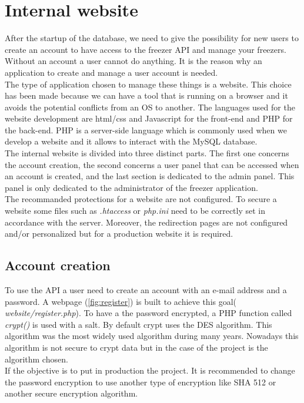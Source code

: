 \section{Internal website}
After the startup of the database, we need to give the possibility for new users to create an account to have access to the freezer API and manage your freezers. Without an account a user cannot do anything. It is the reason why an application to create and manage a user account is needed.\\

The type of application chosen to manage these things is a website. This choice has been made because we can have a tool that is running on a browser and it avoids the potential conflicts from an OS to another. The languages used for the website development are html/css and Javascript for the front-end and PHP for the back-end. PHP is a server-side language which is commonly used when we develop a website and it allows to interact with the MySQL database. \\

The internal website is divided into three distinct parts. The first one concerns the account creation, the second concerns a user panel that can be accessed when an account is created, and the last section is dedicated to the admin panel. This panel is only dedicated to the administrator of the freezer application. \\

The recommanded protections for a website are not configured. To secure a website some files such as \textit{.htaccess} or \textit{php.ini} need to be correctly set in accordance with the server. Moreover, the redirection pages are not configured and/or personalized but for a production website it is required.

\subsection{Account creation}
To use the API a user need to create an account with an e-mail address and a password. A webpage (\autoref{fig:register}) is built to achieve this goal( \textit{website/register.php}). To have a the password encrypted, a PHP function called \textit{crypt()} is used with a salt. By default crypt uses the DES algorithm. This algorithm was the most widely used algorithm during many years. Nowadays this algorithm is not secure to crypt data but in the case of the project is the algorithm chosen.\\
If the objective is to put in production the project. It is recommended to change the password encryption to use another type of encryption like SHA 512 or another secure encryption algorithm.\\

